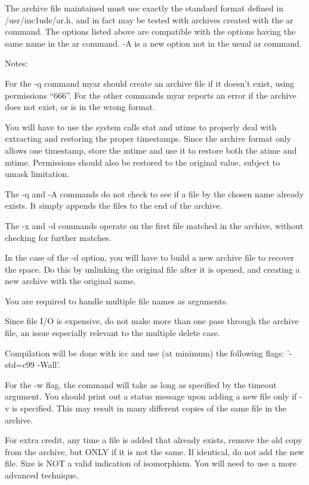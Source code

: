 \documentclass[letterpaper,10pt]{article}
\begin{document}
The archive file maintained must use exactly the standard format defined in
/usr/inc1ude/ar.h, and in fact may be tested with archives created with the ar
command. The options listed above are compatible with the options having the
same name in the ar command. -A is a new option not in the usual ar command.

Notes:

    For the -q command myar should create an archive file if it doesn't exist,
    using permissions ``666''. For the other commands myar reports an error if
    the archive does not exist, or is in the wrong format.

    You will have to use the system calls stat and utime to properly deal with
    extracting and restoring the proper timestamps. Since the archive format
    only allows one timestamp, store the mtime and use it to restore both the
    atime and mtime. Permissions should also be restored to the original value,
    subject to umask limitation.

    The -q and -A commands do not check to see if a file by the chosen name
    already exists. It simply appends the files to the end of the archive.

    The -x and -d commands operate on the first file matched in the archive,
    without checking for further matches.

    In the case of the -d option, you will have to build a new archive file to
    recover the space. Do this by unlinking the original file after it is
    opened, and creating a new archive with the original name.

    You are required to handle multiple file names as arguments.

    Since file I/O is expensive, do not make more than one pass through the
    archive file, an issue especially relevant to the multiple delete case.

    Compilation will be done with icc and use (at minimum) the following flags:
    '-std=c99 -Wall'.

    For the -w flag, the command will take as long as specified by the timeout
    argument. You should print out a status message upon adding a new file only
    if -v is specified. This may result in many different copies of the same
    file in the archive.

    For extra credit, any time a file is added that already exists, remove the
    old copy from the archive, but ONLY if it is not the same. If identical, do
    not add the new file. Size is NOT a valid indication of isomorphism. You
    will need to use a more advanced technique.
\end{document}
